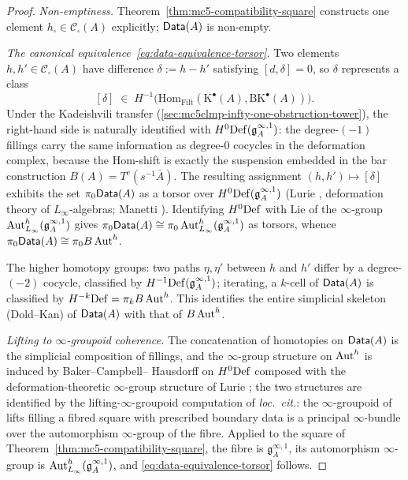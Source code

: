 \begin{proof}
\emph{Non-emptiness.}
Theorem~\textup{\ref{thm:mc5-compatibility-square}} constructs one
element $h_\square\in\mathcal C_\square(A)$ explicitly; $\mathsf{Data}(A)$ is
non-empty.

\emph{The canonical equivalence~\eqref{eq:data-equivalence-torsor}.}
Two elements $h, h'\in\mathcal C_\square(A)$ have difference
$\delta := h - h'$ satisfying $[d,\delta]=0$, so $\delta$ represents a
class
\[
[\delta]\;\in\;
H^{-1}\bigl(\mathrm{Hom}_{\mathrm{Filt}}(
 \mathrm{K}^\bullet(A),\mathrm{BK}^\bullet(A))\bigr).
\]
Under the Kadeishvili transfer
(\textsection\textup{\ref{sec:mc5clmp-infty-one-obstruction-tower}}),
the right-hand side is naturally identified with $H^0\mathrm{Def}(\mathfrak
g^{\infty,1}_A)$: the degree-$(-1)$ fillings carry the same information
as degree-$0$ cocycles in the deformation complex, because the
$\mathrm{Hom}$-shift is exactly the suspension embedded in the bar
construction $B(A) = T^c(s^{-1}\bar A)$. The resulting assignment
$(h,h')\mapsto[\delta]$ exhibits the set $\pi_0\mathsf{Data}(A)$ as a torsor
over $H^0\mathrm{Def}(\mathfrak g^{\infty,1}_A)$ (Lurie \cite[.1]{HA}, deformation theory of $L_\infty$-algebras; Manetti
\cite{Manetti99,Manetti04a}). Identifying $H^0\mathrm{Def}$ with $\mathrm{Lie}$
of the $\infty$-group $\operatorname{Aut}^h_{L_\infty}(\mathfrak g^{\infty,1}_A)$
gives $\pi_0\mathsf{Data}(A) \cong \pi_0\operatorname{Aut}^h_{L_\infty}(\mathfrak
g^{\infty,1}_A)$ as torsors, whence $\pi_0\mathsf{Data}(A)\cong\pi_0 B\operatorname{Aut}^h$.

The higher homotopy groups: two paths $\eta,\eta'$ between $h$ and $h'$
differ by a degree-$(-2)$ cocycle, classified by $H^{-1}\mathrm{Def}(\mathfrak
g^{\infty,1}_A)$; iterating, a $k$-cell of $\mathsf{Data}(A)$ is classified by
$H^{-k}\mathrm{Def} = \pi_k B\operatorname{Aut}^h$. This identifies the entire simplicial
skeleton (Dold--Kan) of $\mathsf{Data}(A)$ with that of $B\operatorname{Aut}^h$.

\emph{Lifting to $\infty$-groupoid coherence.} The concatenation of
homotopies on $\mathsf{Data}(A)$ is the simplicial composition of fillings, and
the $\infty$-group structure on $\operatorname{Aut}^h$ is induced by Baker--Campbell--
Hausdorff on $H^0\mathrm{Def}$ composed with the deformation-theoretic
$\infty$-group structure of Lurie \cite[Theorem~5.5.5.2]{HA}; the two
structures are identified by the lifting-$\infty$-groupoid computation of
\emph{loc.\ cit.}: the $\infty$-groupoid of lifts filling a fibred square
with prescribed boundary data is a principal $\infty$-bundle over the
automorphism $\infty$-group of the fibre. Applied to the square of
Theorem~\textup{\ref{thm:mc5-compatibility-square}}, the fibre is
$\mathfrak g^{\infty,1}_A$, its automorphism $\infty$-group is
$\operatorname{Aut}^h_{L_\infty}(\mathfrak g^{\infty,1}_A)$, and
\eqref{eq:data-equivalence-torsor} follows.


\end{proof}
